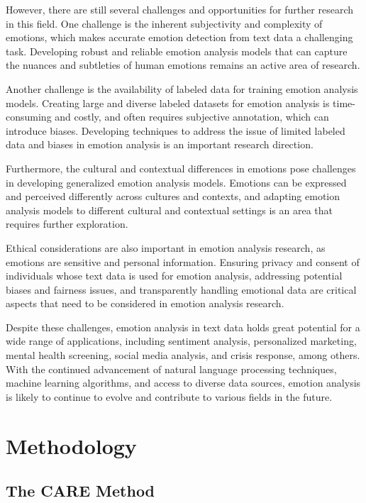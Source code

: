 \documentclass[conference]{IEEEtran}
\begin{document}
However, there are still several challenges and opportunities for further research in this field. One challenge is the inherent subjectivity and complexity of emotions, which makes accurate emotion detection from text data a challenging task. Developing robust and reliable emotion analysis models that can capture the nuances and subtleties of human emotions remains an active area of research.

Another challenge is the availability of labeled data for training emotion analysis models. Creating large and diverse labeled datasets for emotion analysis is time-consuming and costly, and often requires subjective annotation, which can introduce biases. Developing techniques to address the issue of limited labeled data and biases in emotion analysis is an important research direction.

Furthermore, the cultural and contextual differences in emotions pose challenges in developing generalized emotion analysis models. Emotions can be expressed and perceived differently across cultures and contexts, and adapting emotion analysis models to different cultural and contextual settings is an area that requires further exploration.

Ethical considerations are also important in emotion analysis research, as emotions are sensitive and personal information. Ensuring privacy and consent of individuals whose text data is used for emotion analysis, addressing potential biases and fairness issues, and transparently handling emotional data are critical aspects that need to be considered in emotion analysis research.

Despite these challenges, emotion analysis in text data holds great potential for a wide range of applications, including sentiment analysis, personalized marketing, mental health screening, social media analysis, and crisis response, among others. With the continued advancement of natural language processing techniques, machine learning algorithms, and access to diverse data sources, emotion analysis is likely to continue to evolve and contribute to various fields in the future.

\section{Methodology}

\subsection{The CARE Method}
\end{document}
